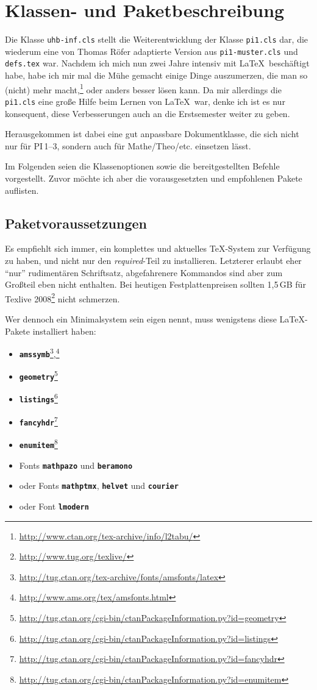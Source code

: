 \documentclass[palatino,gruppe-aus,semester-aus,veranstaltung-aus,abgabe-aus,tutor-aus,utf]{../cls/uhb-inf}
\def\option#1{\texttt{\bfseries #1}}
\begin{document}
\section{Klassen- und Paketbeschreibung}

Die Klasse \texttt{uhb-inf.cls} stellt die Weiterentwicklung der Klasse \texttt{pi1.cls} dar, die wiederum eine von Thomas Röfer adaptierte Version aus \texttt{pi1-muster.cls} und \texttt{defs.tex} war. Nachdem ich mich nun zwei Jahre intensiv mit \LaTeX\ beschäftigt habe, habe ich mir mal die Mühe gemacht einige Dinge auszumerzen, die man so (nicht) mehr macht,\footnote{\url{http://www.ctan.org/tex-archive/info/l2tabu/}} oder anders besser lösen kann. Da mir allerdings die \texttt{pi1.cls} eine große Hilfe beim Lernen von \LaTeX\ war, denke ich ist es nur konsequent, diese Verbesserungen auch an die Erstsemester weiter zu geben.

Herausgekommen ist dabei eine gut anpassbare Dokumentklasse, die sich nicht nur für PI\,1--3, sondern auch für Mathe/Theo/etc. einsetzen lässt.

Im Folgenden seien die Klassenoptionen sowie die bereitgestellten Befehle vorgestellt. Zuvor möchte ich aber die vorausgesetzten und empfohlenen Pakete auflisten.

\subsection{Paketvoraussetzungen}

Es empfiehlt sich immer, ein komplettes und aktuelles \TeX-System zur Verfügung zu haben, und nicht nur den \textit{required}-Teil zu installieren. Letzterer erlaubt eher "`nur"' rudimentären Schriftsatz, abgefahrenere Kommandos sind aber zum Großteil eben nicht enthalten. Bei heutigen Festplattenpreisen sollten 1,5\,GB für Texlive 2008\footnote{\url{http://www.tug.org/texlive/}} nicht schmerzen.

Wer dennoch ein Minimalsystem sein eigen nennt, muss wenigstens diese \LaTeX-Pakete installiert haben:

\begin{itemize}[noitemsep]
	\item \option{amssymb}\footnote{\url{http://tug.ctan.org/tex-archive/fonts/amsfonts/latex}},\footnote{\url{http://www.ams.org/tex/amsfonts.html}}
	\item \option{geometry}\footnote{\url{http://tug.ctan.org/cgi-bin/ctanPackageInformation.py?id=geometry}}
	\item \option{listings}\footnote{\url{http://tug.ctan.org/cgi-bin/ctanPackageInformation.py?id=listings}}
	\item \option{fancyhdr}\footnote{\url{http://tug.ctan.org/cgi-bin/ctanPackageInformation.py?id=fancyhdr}}
	\item \option{enumitem}\footnote{\url{http://tug.ctan.org/cgi-bin/ctanPackageInformation.py?id=enumitem}}
	\item Fonts \option{mathpazo} und \option{beramono}
	\item oder Fonts \option{mathptmx}, \option{helvet} und \option{courier}
	\item oder Font \option{lmodern}
\end{itemize}
\end{document}
